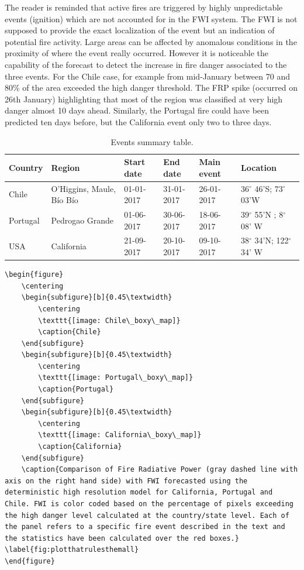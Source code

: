 \documentclass[, manuscript]{copernicus}
\begin{document}
The reader is reminded that active fires are triggered by highly
unpredictable events (ignition) which are not accounted for in the FWI
system. The FWI is not supposed to provide the exact localization of the
event but an indication of potential fire activity. Large areas can be
affected by anomalous conditions in the proximity of where the event
really occurred. However it is noticeable the capability of the forecast
to detect the increase in fire danger associated to the three events.
For the Chile case, for example from mid-January between 70 and 80\% of
the area exceeded the high danger threshold. The FRP spike (occurred on
26th January) highlighting that most of the region was classified at
very high danger almost 10 days ahead. Similarly, the Portugal fire
could have been predicted ten days before, but the California event only
two to three days.

\begin{table}
\caption{Events summary table.}
\label{tab:fires}
\begin{center}
\begin{tabular}{|llllll|}
\hline
Country  & Region          & Start date & End date &Main event & Location  \\\hline
Chile    & O'Higgins, Maule, B\'io B\'io  & 01-01-2017 & 31-01-2017& 26-01-2017& 36$^\circ$ 46'S; 73$^\circ$ 03'W \\
Portugal & Pedrogao Grande & 01-06-2017 & 30-06-2017 &18-06-2017 & 39$^\circ$ 55'N ; 8$^\circ$ 08' W\\
USA      & California      & 21-09-2017 & 20-10-2017 &09-10-2017& 38$^\circ$ 34'N; 122$^\circ$ 34' W\\
\hline
\end{tabular}
\end{center}
\end{table}

\begin{verbatim}
\begin{figure}
    \centering
    \begin{subfigure}[b]{0.45\textwidth}
        \centering
        \texttt{[image: Chile\_boxy\_map]}
        \caption{Chile}
    \end{subfigure}
    \begin{subfigure}[b]{0.45\textwidth}
        \centering
        \texttt{[image: Portugal\_boxy\_map]}
        \caption{Portugal}
    \end{subfigure}
    \begin{subfigure}[b]{0.45\textwidth}
        \centering
        \texttt{[image: California\_boxy\_map]}
        \caption{California}
    \end{subfigure}
    \caption{Comparison of Fire Radiative Power (gray dashed line with axis on the right hand side) with FWI forecasted using the deterministic high resolution model for California, Portugal and  Chile. FWI is color coded based on the percentage of pixels exceeding the high danger level calculated at the country/state level. Each of the panel refers to a specific fire event described in the text and the statistics have been calculated over the red boxes.} \label{fig:plotthatrulesthemall}
\end{figure}
\end{verbatim}
\end{document}
